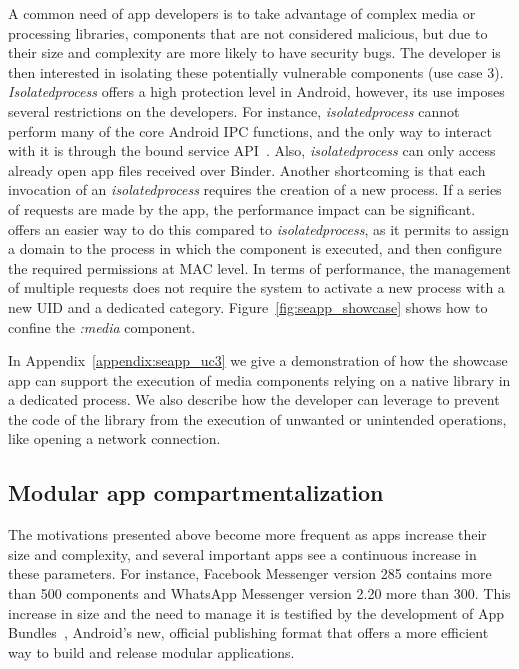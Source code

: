 A common need of app developers is to take advantage of complex media
or processing libraries, components that are not considered malicious,
but due to their size and complexity are more likely to have security
bugs.  The developer is then interested in isolating these potentially
vulnerable components (use case 3).  {\em Isolatedprocess} offers a
high protection level in Android, however, its use imposes several
restrictions on the developers.  For instance, {\em isolatedprocess}
cannot perform many of the core Android IPC functions, and the only
way to interact with it is through the bound service
API~\cite{seapp_bound_service_api}.  Also, {\em isolatedprocess} can
only access already open app files received over Binder.  Another
shortcoming is that each invocation of an {\em isolatedprocess}
requires the creation of a new process.  If a series of requests are
made by the app, the performance impact can be significant.  \seapp
offers an easier way to do this compared to {\em isolatedprocess}, as
it permits to assign a domain to the process in which the component is
executed, and then configure the required permissions at MAC level.
In terms of performance, the management of multiple requests does not
require the system to activate a new process with a new UID and a
dedicated \sel category.  Figure~\ref{fig:seapp_showcase} shows how to
confine the {\em :media} component.

In Appendix~\ref{appendix:seapp_uc3} we give a demonstration of how
the showcase app can support the execution of media components relying
on a native library in a dedicated process. We also describe how the
developer can leverage \seapp to prevent the code of the library from
the execution of unwanted or unintended operations, like opening a
network connection.


\subsection{Modular app compartmentalization}

The motivations presented above become more frequent as apps increase
their size and complexity, and several important apps see a continuous
increase in these parameters.  For instance, Facebook Messenger
version 285 contains more than 500 components and WhatsApp Messenger
version 2.20 more than 300.  This increase in size and the need to
manage it is testified by the development of App
Bundles~\cite{seapp_app_bundles}, Android's new, official publishing
format that offers a more efficient way to build and release modular
applications.

